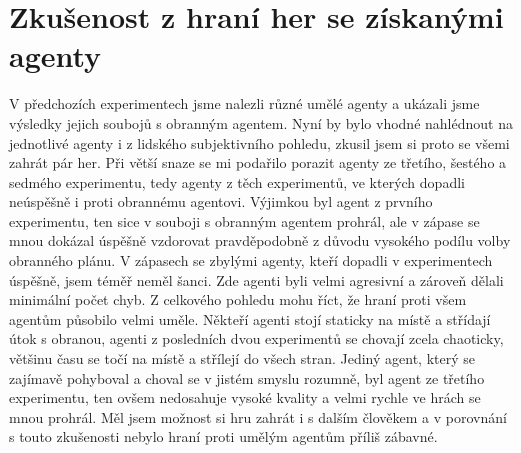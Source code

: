 \section{Zkušenost z hraní her se získanými agenty}
V předchozích experimentech jsme nalezli různé umělé agenty a ukázali jsme výsledky jejich soubojů s obranným agentem.
Nyní by bylo vhodné nahlédnout na jednotlivé agenty i z lidského subjektivního pohledu, zkusil jsem si proto se všemi zahrát pár her.
Při větší snaze se mi podařilo porazit agenty ze třetího, šestého a sedmého experimentu, tedy agenty z těch experimentů, ve kterých dopadli neúspěšně i proti obrannému agentovi.
Výjimkou byl agent z prvního experimentu, ten sice v souboji s obranným agentem prohrál, ale v zápase se mnou dokázal úspěšně vzdorovat pravděpodobně z důvodu vysokého podílu volby obranného plánu.
V zápasech se zbylými agenty, kteří dopadli v experimentech úspěšně, jsem téměř neměl šanci. 
Zde agenti byli velmi agresivní a zároveň dělali minimální počet chyb.
Z celkového pohledu mohu říct, že hraní proti všem agentům působilo velmi uměle.
Někteří agenti stojí staticky na místě a střídají útok s obranou, agenti z posledních dvou experimentů se chovají zcela chaoticky, většinu času se točí na místě a střílejí do všech stran.
Jediný agent, který se zajímavě pohyboval a choval se v jistém smyslu rozumně, byl agent ze třetího experimentu, ten ovšem nedosahuje vysoké kvality a velmi rychle ve hrách se mnou prohrál.
Měl jsem možnost si hru zahrát i s dalším člověkem a v porovnání s touto zkušenosti nebylo hraní proti umělým agentům příliš zábavné.


